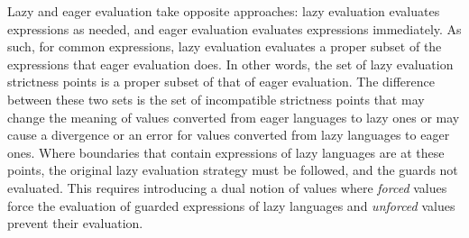 Lazy and eager evaluation take opposite approaches: lazy evaluation evaluates expressions as needed, and eager evaluation evaluates expressions immediately. As such, for common expressions, lazy evaluation evaluates a proper subset of the expressions that eager evaluation does. In other words, the set of lazy evaluation strictness points is a proper subset of that of eager evaluation. The difference between these two sets is the set of incompatible strictness points that may change the meaning of values converted from eager languages to lazy ones or may cause a divergence or an error for values converted from lazy languages to eager ones. Where boundaries that contain expressions of lazy languages are at these points, the original lazy evaluation strategy must be followed, and the guards not evaluated. This requires introducing a dual notion of values where \emph{forced} values force the evaluation of guarded expressions of lazy languages and \emph{unforced} values prevent their evaluation.